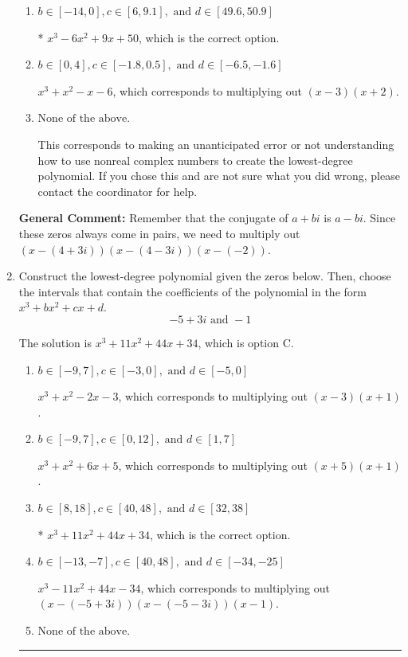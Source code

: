 \documentclass{extbook}[14pt]
\newcommand{\litem}[1]{\item #1

\rule{\textwidth}{0.4pt}}
\begin{document}
\begin{enumerate}
{\begin{enumerate}[label=\Alph*.]
$x^{3} + x^{2} -2 x -8$, which corresponds to multiplying out $(x -4)(x + 2)$.
\item \( b \in [-14, 0], c \in [6, 9.1], \text{ and } d \in [49.6, 50.9] \)

* $x^{3} -6 x^{2} +9 x + 50$, which is the correct option.
\item \( b \in [0, 4], c \in [-1.8, 0.5], \text{ and } d \in [-6.5, -1.6] \)

$x^{3} + x^{2} -x -6$, which corresponds to multiplying out $(x -3)(x + 2)$.
\item \( \text{None of the above.} \)

This corresponds to making an unanticipated error or not understanding how to use nonreal complex numbers to create the lowest-degree polynomial. If you chose this and are not sure what you did wrong, please contact the coordinator for help.
\end{enumerate}

\textbf{General Comment:} Remember that the conjugate of $a+bi$ is $a-bi$. Since these zeros always come in pairs, we need to multiply out $(x-(4 + 3 i))(x-(4 - 3 i))(x-(-2))$.
}
\litem{
Construct the lowest-degree polynomial given the zeros below. Then, choose the intervals that contain the coefficients of the polynomial in the form $x^3+bx^2+cx+d$.
\[ -5 + 3 i \text{ and } -1 \]

The solution is \( x^{3} +11 x^{2} +44 x + 34 \), which is option C.\begin{enumerate}[label=\Alph*.]
\item \( b \in [-9, 7], c \in [-3, 0], \text{ and } d \in [-5, 0] \)

$x^{3} + x^{2} -2 x -3$, which corresponds to multiplying out $(x -3)(x + 1)$.
\item \( b \in [-9, 7], c \in [0, 12], \text{ and } d \in [1, 7] \)

$x^{3} + x^{2} +6 x + 5$, which corresponds to multiplying out $(x + 5)(x + 1)$.
\item \( b \in [8, 18], c \in [40, 48], \text{ and } d \in [32, 38] \)

* $x^{3} +11 x^{2} +44 x + 34$, which is the correct option.
\item \( b \in [-13, -7], c \in [40, 48], \text{ and } d \in [-34, -25] \)

$x^{3} -11 x^{2} +44 x -34$, which corresponds to multiplying out $(x-(-5 + 3 i))(x-(-5 - 3 i))(x -1)$.
\item \( \text{None of the above.} \)


\end{enumerate}}
\end{enumerate}
\end{document}

